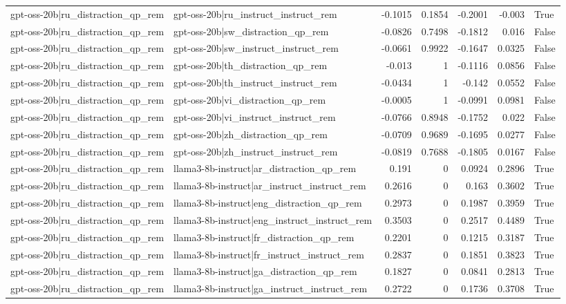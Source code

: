 \begin{table}
\begin{tabular}{l l r r r r l}
gpt-oss-20b|ru_distraction_qp_rem & gpt-oss-20b|ru_instruct_instruct_rem & -0.1015 & 0.1854 & -0.2001 & -0.003 & True \\
gpt-oss-20b|ru_distraction_qp_rem & gpt-oss-20b|sw_distraction_qp_rem & -0.0826 & 0.7498 & -0.1812 & 0.016 & False \\
gpt-oss-20b|ru_distraction_qp_rem & gpt-oss-20b|sw_instruct_instruct_rem & -0.0661 & 0.9922 & -0.1647 & 0.0325 & False \\
gpt-oss-20b|ru_distraction_qp_rem & gpt-oss-20b|th_distraction_qp_rem & -0.013 & 1 & -0.1116 & 0.0856 & False \\
gpt-oss-20b|ru_distraction_qp_rem & gpt-oss-20b|th_instruct_instruct_rem & -0.0434 & 1 & -0.142 & 0.0552 & False \\
gpt-oss-20b|ru_distraction_qp_rem & gpt-oss-20b|vi_distraction_qp_rem & -0.0005 & 1 & -0.0991 & 0.0981 & False \\
gpt-oss-20b|ru_distraction_qp_rem & gpt-oss-20b|vi_instruct_instruct_rem & -0.0766 & 0.8948 & -0.1752 & 0.022 & False \\
gpt-oss-20b|ru_distraction_qp_rem & gpt-oss-20b|zh_distraction_qp_rem & -0.0709 & 0.9689 & -0.1695 & 0.0277 & False \\
gpt-oss-20b|ru_distraction_qp_rem & gpt-oss-20b|zh_instruct_instruct_rem & -0.0819 & 0.7688 & -0.1805 & 0.0167 & False \\
gpt-oss-20b|ru_distraction_qp_rem & llama3-8b-instruct|ar_distraction_qp_rem & 0.191 & 0 & 0.0924 & 0.2896 & True \\
gpt-oss-20b|ru_distraction_qp_rem & llama3-8b-instruct|ar_instruct_instruct_rem & 0.2616 & 0 & 0.163 & 0.3602 & True \\
gpt-oss-20b|ru_distraction_qp_rem & llama3-8b-instruct|eng_distraction_qp_rem & 0.2973 & 0 & 0.1987 & 0.3959 & True \\
gpt-oss-20b|ru_distraction_qp_rem & llama3-8b-instruct|eng_instruct_instruct_rem & 0.3503 & 0 & 0.2517 & 0.4489 & True \\
gpt-oss-20b|ru_distraction_qp_rem & llama3-8b-instruct|fr_distraction_qp_rem & 0.2201 & 0 & 0.1215 & 0.3187 & True \\
gpt-oss-20b|ru_distraction_qp_rem & llama3-8b-instruct|fr_instruct_instruct_rem & 0.2837 & 0 & 0.1851 & 0.3823 & True \\
gpt-oss-20b|ru_distraction_qp_rem & llama3-8b-instruct|ga_distraction_qp_rem & 0.1827 & 0 & 0.0841 & 0.2813 & True \\
gpt-oss-20b|ru_distraction_qp_rem & llama3-8b-instruct|ga_instruct_instruct_rem & 0.2722 & 0 & 0.1736 & 0.3708 & True \\

\end{tabular}
\end{table}

